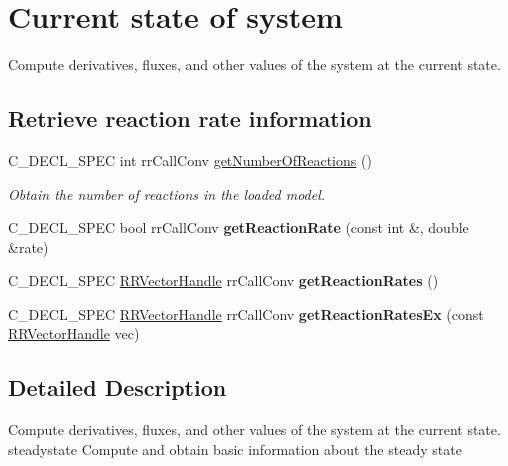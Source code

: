 \hypertarget{group__state}{
\section{\-Current state of system}
\label{group__state}
}


\-Compute derivatives, fluxes, and other values of the system at the current state.  


\subsection*{\-Retrieve reaction rate information}
\begin{DoxyCompactItemize}
\item 
\-C\-\_\-\-D\-E\-C\-L\-\_\-\-S\-P\-E\-C int rr\-Call\-Conv \hyperlink{group__state_gae25399f84ff2d1fda619358a1af9a1b5}{get\-Number\-Of\-Reactions} ()
\begin{DoxyCompactList}\small\item\em \-Obtain the number of reactions in the loaded model. \end{DoxyCompactList}\item 
\hypertarget{group__state_ga0a7be404315c6001627ee26e738e11e2}{
\-C\-\_\-\-D\-E\-C\-L\-\_\-\-S\-P\-E\-C bool rr\-Call\-Conv {\bfseries get\-Reaction\-Rate} (const int \&, double \&rate)}
\label{group__state_ga0a7be404315c6001627ee26e738e11e2}

\item 
\hypertarget{group__state_ga86d544bcf3eeaa4698a60123a3da69aa}{
\-C\-\_\-\-D\-E\-C\-L\-\_\-\-S\-P\-E\-C \hyperlink{rr__c__types_8h_aea46a16752b0ae2cd95c009030ee630e}{\-R\-R\-Vector\-Handle} \*
rr\-Call\-Conv {\bfseries get\-Reaction\-Rates} ()}
\label{group__state_ga86d544bcf3eeaa4698a60123a3da69aa}

\item 
\hypertarget{group__state_gaa03d9414ddeb177a76365dd5b2d0042e}{
\-C\-\_\-\-D\-E\-C\-L\-\_\-\-S\-P\-E\-C \hyperlink{rr__c__types_8h_aea46a16752b0ae2cd95c009030ee630e}{\-R\-R\-Vector\-Handle} \*
rr\-Call\-Conv {\bfseries get\-Reaction\-Rates\-Ex} (const \hyperlink{rr__c__types_8h_aea46a16752b0ae2cd95c009030ee630e}{\-R\-R\-Vector\-Handle} vec)}
\label{group__state_gaa03d9414ddeb177a76365dd5b2d0042e}

\end{DoxyCompactItemize}


\subsection{\-Detailed \-Description}
\-Compute derivatives, fluxes, and other values of the system at the current state. steadystate \-Compute and obtain basic information about the steady state 

